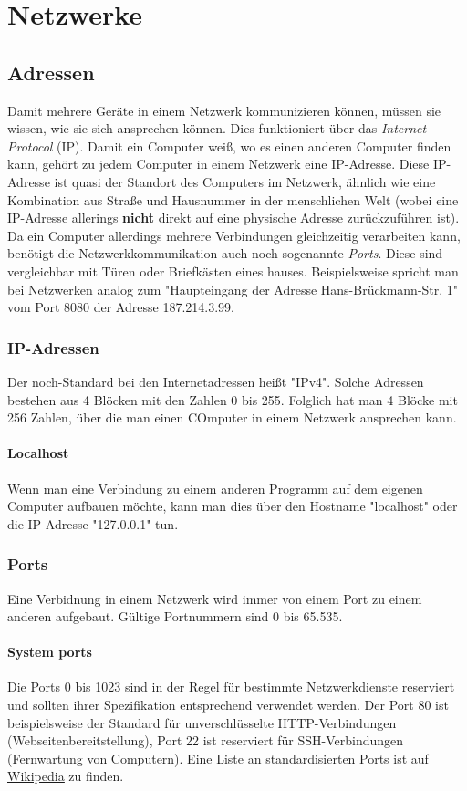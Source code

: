 \documentclass{article}
\begin{document}
	\section{Netzwerke}
	\subsection{Adressen}
	Damit mehrere Geräte in einem Netzwerk kommunizieren können, müssen sie wissen, wie sie sich ansprechen können. Dies funktioniert über das \textit{Internet Protocol} (IP). Damit ein Computer weiß, wo es einen anderen Computer finden kann, gehört zu jedem Computer in einem Netzwerk eine IP-Adresse. Diese IP-Adresse ist quasi der Standort des Computers im Netzwerk, ähnlich wie eine Kombination aus Straße und Hausnummer in der menschlichen Welt (wobei eine IP-Adresse allerings \textbf{nicht} direkt auf eine physische Adresse zurückzuführen ist). Da ein Computer allerdings mehrere Verbindungen gleichzeitig verarbeiten kann, benötigt die Netzwerkkommunikation  auch noch sogenannte \textit{Ports}. Diese sind vergleichbar mit Türen oder Briefkästen eines hauses. Beispielsweise spricht man bei Netzwerken analog zum "Haupteingang der Adresse Hans-Brückmann-Str. 1" vom Port 8080 der Adresse 187.214.3.99.

	\subsubsection{IP-Adressen}
	Der noch-Standard bei den Internetadressen heißt "IPv4". Solche Adressen bestehen aus 4 Blöcken mit den Zahlen 0 bis 255. Folglich hat man 4 Blöcke mit 256 Zahlen, über die man einen COmputer in einem Netzwerk ansprechen kann.

	\paragraph{Localhost}
	Wenn man eine Verbindung zu einem anderen Programm auf dem eigenen Computer aufbauen möchte, kann man dies über den Hostname "localhost" oder die IP-Adresse "127.0.0.1" tun.

	\subsubsection{Ports}
	Eine Verbidnung in einem Netzwerk wird immer von einem Port zu einem anderen aufgebaut. Gültige Portnummern sind 0 bis 65.535. 
	
	\paragraph{System ports}
	Die Ports 0 bis 1023 sind in der Regel für bestimmte Netzwerkdienste reserviert und sollten ihrer Spezifikation entsprechend verwendet werden. Der Port 80 ist beispielsweise der Standard für unverschlüsselte HTTP-Verbindungen (Webseitenbereitstellung), Port 22 ist reserviert für SSH-Verbindungen (Fernwartung von Computern). Eine Liste an standardisierten Ports ist auf \href{https://de.wikipedia.org/wiki/Liste_der_standardisierten_Ports}{\underline{Wikipedia}} zu finden.
\end{document}
